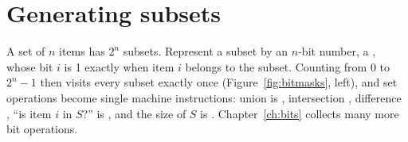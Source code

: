 \section[Generating subsets]{Generating subsets \hfill \bronze}\label{sec:subsets}

A set of $n$ items has $2^n$ subsets. Represent a subset by an $n$-bit number, a , whose bit $i$ is 1 exactly
when item $i$ belongs to the subset. Counting from $0$ to $2^n - 1$ then visits every subset exactly once
(Figure~\ref{fig:bitmasks}, left), and set operations become single machine instructions: union is ,
intersection , difference , ``is item $i$ in $S$?'' is , and the size of $S$ is
. Chapter~\ref{ch:bits} collects many more bit operations.

